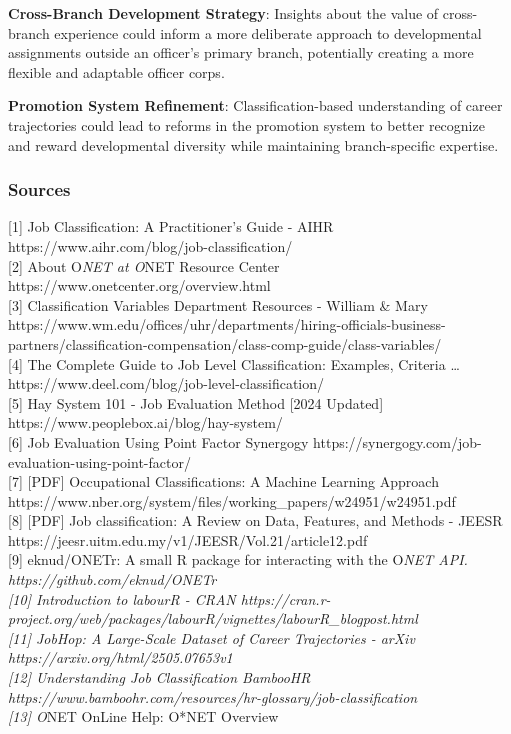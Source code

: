 \documentclass[./main.tex]{subfiles}
\begin{document}
\textbf{Cross-Branch Development Strategy}: Insights about the value of
cross-branch experience could inform a more deliberate approach to
developmental assignments outside an officer's primary branch,
potentially creating a more flexible and adaptable officer corps.

\textbf{Promotion System Refinement}: Classification-based understanding
of career trajectories could lead to reforms in the promotion system to
better recognize and reward developmental diversity while maintaining
branch-specific expertise.

\subsubsection{Sources}\label{sources}

{[}1{]} Job Classification: A Practitioner's Guide - AIHR
https://www.aihr.com/blog/job-classification/\\
{[}2{]} About O\emph{NET at O}NET Resource Center
https://www.onetcenter.org/overview.html\\
{[}3{]} Classification Variables \textbar{} Department Resources -
William \& Mary
https://www.wm.edu/offices/uhr/departments/hiring-officials-business-partners/classification-compensation/class-comp-guide/class-variables/\\
{[}4{]} The Complete Guide to Job Level Classification: Examples,
Criteria \ldots{} https://www.deel.com/blog/job-level-classification/\\
{[}5{]} Hay System 101 - Job Evaluation Method {[}2024 Updated{]}
https://www.peoplebox.ai/blog/hay-system/\\
{[}6{]} Job Evaluation Using Point Factor \textbar{} Synergogy
https://synergogy.com/job-evaluation-using-point-factor/\\
{[}7{]} {[}PDF{]} Occupational Classifications: A Machine Learning
Approach
https://www.nber.org/system/files/working\_papers/w24951/w24951.pdf\\
{[}8{]} {[}PDF{]} Job classification: A Review on Data, Features, and
Methods - JEESR
https://jeesr.uitm.edu.my/v1/JEESR/Vol.21/article12.pdf\\
{[}9{]} eknud/ONETr: A small R package for interacting with the
O\emph{NET API. https://github.com/eknud/ONETr\\
{[}10{]} Introduction to labourR - CRAN
https://cran.r-project.org/web/packages/labourR/vignettes/labourR\_blogpost.html\\
{[}11{]} JobHop: A Large-Scale Dataset of Career Trajectories - arXiv
https://arxiv.org/html/2505.07653v1\\
{[}12{]} Understanding Job Classification \textbar{} BambooHR
https://www.bamboohr.com/resources/hr-glossary/job-classification\\
{[}13{]} O}NET OnLine Help: O*NET Overview
\end{document}
